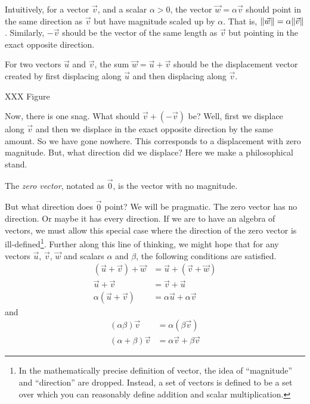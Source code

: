 Intuitively, for a vector $\vec v$, and a scalar $\alpha>0$, the
vector $\vec w=\alpha\vec v$ should point in the same direction as
$\vec v$ but have magnitude scaled up by $\alpha$.  That is, $\lVert\vec w\rVert=\alpha\lVert\vec v\rVert$.
Similarly, $-\vec v$ should be the vector of the same length as $\vec v$ but
pointing in the exact opposite direction.

For two vectors $\vec u$ and $\vec v$, the sum $\vec w=\vec u+\vec v$
should be the displacement vector created by first displacing along $\vec u$
and then displacing along $\vec v$.

XXX Figure

Now, there is one snag.  What should $\vec v+(-\vec v)$ be?  Well, first we
displace along $\vec v$ and then we displace in the exact opposite direction 
by the same amount.  So we have gone nowhere.  This corresponds to a displacement
with zero magnitude.  But, what direction did we displace?  Here we make a philosophical
stand.
\begin{definition}
	The \emph{zero vector}, notated as $\vec 0$, 
	is the vector with no magnitude.
\end{definition}
But what direction does $\vec 0$ point?  We will be pragmatic.
The zero vector has no direction.  Or maybe it has every direction.
If we are to have an algebra of vectors, we
must allow this special case where the direction of the zero vector is ill-defined\footnote{
	In the mathematically precise definition of vector, the idea of ``magnitude''
	and ``direction'' are dropped.  Instead, a set of vectors is defined to be
	a set over which you can reasonably define addition and scalar multiplication.
}.  Further along this line of thinking, we might hope that for any
vectors $\vec u$, $\vec v$, $\vec w$ and scalars $\alpha$ and $\beta$, the
following conditions are satisfied.
\begin{align*}
	(\vec u+\vec v)+\vec w&=\vec u+(\vec v+\vec w)\tag{Associativity}\\
	\vec u+\vec v&=\vec v+\vec u\tag{Commutativity}\\
	\alpha(\vec u+\vec v)&=\alpha\vec u+\alpha \vec v\tag{Distributivity}
\end{align*}
and 
\begin{align*}
	(\alpha\beta)\vec v&=\alpha(\beta \vec v)\tag{Associativity II}\\
	(\alpha+\beta)\vec v&=\alpha\vec v+\beta \vec v\tag{Distributivity II}
\end{align*}

